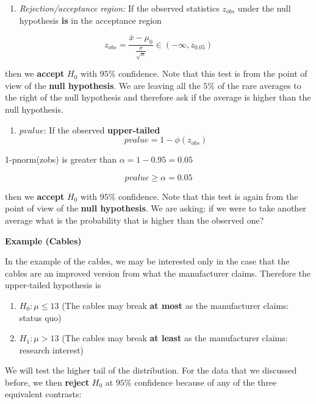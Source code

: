 \documentclass[
]{book}
\providecommand{\tightlist}{%
  \setlength{\itemsep}{0pt}\setlength{\parskip}{0pt}}
\begin{document}
\begin{enumerate}
\def\labelenumi{\arabic{enumi}.}
\setcounter{enumi}{1}
\tightlist
\item
  \emph{Rejection/acceptance region:} If the observed statistics \(z_{obs}\) under the null hypothesis \textbf{is} in the acceptance region
\end{enumerate}

\[z_{obs}=\frac{\bar{x}-\mu_0}{\frac{\sigma}{\sqrt{n}}} \in (-\infty, z_{0.05})\]

then we \textbf{accept} \(H_0\) with \(95\%\) confidence. Note that this test is from the point of view of the \textbf{null hypothesis}. We are leaving all the \(5\%\) of the rare averages to the right of the null hypothesis and therefore ask if the average is higher than the null hypothesis.

\begin{enumerate}
\def\labelenumi{\arabic{enumi}.}
\setcounter{enumi}{2}
\tightlist
\item
  \(pvalue\): If the observed \textbf{upper-tailed} \[pvalue= 1-\phi(z_{obs})\]
\end{enumerate}

1-pnorm(zobs) is greater than \(\alpha=1-0.95=0.05\)

\[pvalue \geq \alpha =0.05\]

then we \textbf{accept} \(H_0\) with \(95\%\) confidence. Note that this test is again from the point of view of the \textbf{null hypothesis}. We are asking: if we were to take another average what is the probability that is higher than the observed one?

\textbf{Example (Cables)}

In the example of the cables, we may be interested only in the case that the cables are an improved version from what the manufacturer claims. Therefore the upper-tailed hypothesis is

\begin{enumerate}
\def\labelenumi{\alph{enumi}.}
\tightlist
\item
  \(H_0:\mu \leq 13\) (The cables may break \textbf{at most} as the manufacturer claims: status quo)
\item
  \(H_1:\mu > 13\) (The cables may break \textbf{at least} as the manufacturer claims: research interest)
\end{enumerate}

We will test the higher tail of the distribution.
For the data that we discussed before, we then \textbf{reject} \(H_0\) at \(95\%\) confidence because of any of the three equivalent contrasts:
\end{document}

